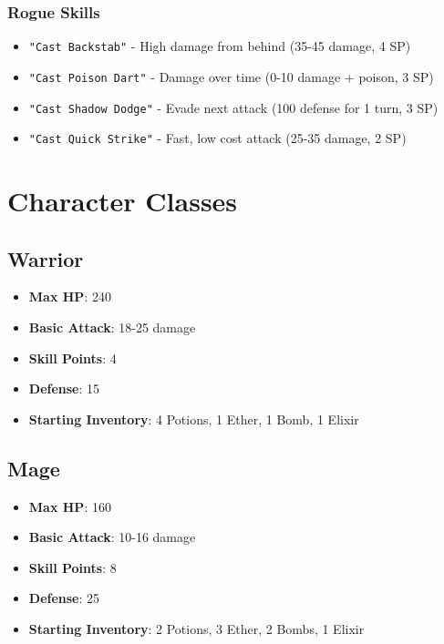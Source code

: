 \documentclass[12pt]{article}
\begin{document}
\subsubsection{Rogue Skills}
\begin{itemize}
    \item \texttt{"Cast Backstab"} - High damage from behind (35-45 damage, 4 SP)
    \item \texttt{"Cast Poison Dart"} - Damage over time (0-10 damage + poison, 3 SP)
    \item \texttt{"Cast Shadow Dodge"} - Evade next attack (100 defense for 1 turn, 3 SP)
    \item \texttt{"Cast Quick Strike"} - Fast, low cost attack (25-35 damage, 2 SP)
\end{itemize}

\section{Character Classes}
\label{sec:character-classes}

\subsection{Warrior}
\begin{itemize}
    \item \textbf{Max HP}: 240
    \item \textbf{Basic Attack}: 18-25 damage
    \item \textbf{Skill Points}: 4
    \item \textbf{Defense}: 15
    \item \textbf{Starting Inventory}: 4 Potions, 1 Ether, 1 Bomb, 1 Elixir
\end{itemize}

\subsection{Mage}
\begin{itemize}
    \item \textbf{Max HP}: 160
    \item \textbf{Basic Attack}: 10-16 damage
    \item \textbf{Skill Points}: 8
    \item \textbf{Defense}: 25
    \item \textbf{Starting Inventory}: 2 Potions, 3 Ether, 2 Bombs, 1 Elixir
\end{itemize}
\end{document}
